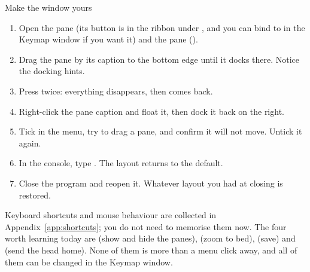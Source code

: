 \begin{tryit}{Make the window yours}
\begin{enumerate}[label=\arabic*.,leftmargin=1.4em]
  \item Open the  pane (its button is in the ribbon under
        , and you can bind  to  in
        the Keymap window if you want it) and the  pane
        ().
  \item Drag the  pane by its caption to the bottom edge until it
        docks there. Notice the docking hints.
  \item Press  twice: everything disappears, then comes back.
  \item Right-click the  pane caption and float it, then dock it back
        on the right.
  \item Tick  in the  menu, try to drag a pane, and
        confirm it will not move. Untick it again.
  \item In the console, type . The layout returns to the default.
  \item Close the program and reopen it. Whatever layout you had at closing is
        restored.
\end{enumerate}
\end{tryit}

\noindent Keyboard shortcuts and mouse behaviour are collected in
Appendix~\ref{app:shortcuts}; you do not need to memorise them now. The four
worth learning today are  (show and hide the panes), 
(zoom to bed),  (save) and  (send the head home). None of
them is more than a menu click away, and all of them can be changed in the
Keymap window.
